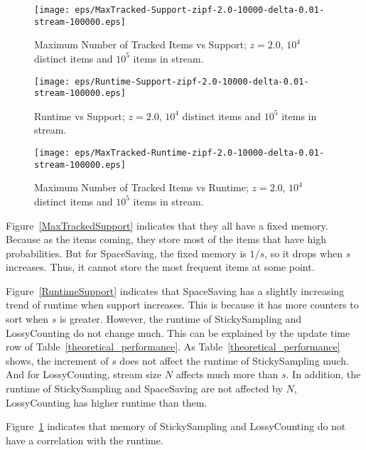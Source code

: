 \documentclass[10pt]{article}
\begin{document}
\begin{figure}[H]
      \begin{minipage}{0.48\textwidth}
        \centering
        \texttt{[image: eps/MaxTracked-Support-zipf-2.0-10000-delta-0.01-stream-100000.eps]}
        \caption{Maximum Number of Tracked Items vs Support; $z=2.0$, $10^4$ distinct items and $10^5$ items in stream.}
        \label{MaxTrackedSupport}
      \end{minipage}\hfill
      \begin{minipage}{0.48\textwidth}
        \centering
        \texttt{[image: eps/Runtime-Support-zipf-2.0-10000-delta-0.01-stream-100000.eps]}
        \caption{Runtime vs Support; $z=2.0$, $10^4$ distinct items and $10^5$ items in stream.}
        \label{RuntimeSupport}
      \end{minipage}
      \centering
      \begin{minipage}{0.48\textwidth}
        \centering
        \texttt{[image: eps/MaxTracked-Runtime-zipf-2.0-10000-delta-0.01-stream-100000.eps]}
        \caption{Maximum Number of Tracked Items vs Runtime; $z=2.0$, $10^4$ distinct items and $10^5$ items in stream.}
        \label{MaxTrackedRuntime}
      \end{minipage}
\end{figure}
Figure~\ref{MaxTrackedSupport} indicates that they all have a fixed memory.
Because as the items coming, they store most of the items that have high probabilities.
But for SpaceSaving, the fixed memory is $1/s$, so it drops when $s$ increases. 
Thus, it cannot store the most frequent items at some point. 

Figure~\ref{RuntimeSupport} indicates that SpaceSaving has a slightly increasing trend of runtime when
support increases. This is because it has more counters to sort when $s$ is greater.
However, the runtime of StickySampling and LossyCounting do not change much.
This can be explained by the update time row of Table~\ref{theoretical_performance}.
As Table~\ref{theoretical_performance} shows, the increment of $s$ does not affect the runtime of StickySampling much. And for LossyCounting, stream size $N$
affects much more than $s$. In addition, the runtime of StickySampling and SpaceSaving are not affected by $N$, 
LossyCounting has higher runtime than them.

Figure~\ref{MaxTrackedRuntime} indicates that memory of StickySampling and LossyCounting
do not have a correlation with the runtime. 
\end{document}
